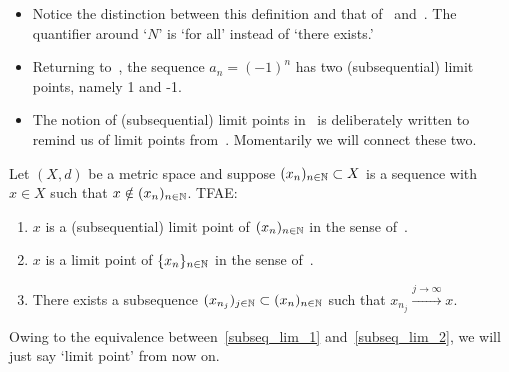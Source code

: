 \begin{rem}
\begin{itemize}
	\item Notice the distinction between this definition and that of~ and~. The quantifier around `$N$' is `for all' instead of `there exists.'
	\item Returning to~, the sequence $a_n = (-1)^n$ has two (subsequential) limit points, namely 1 and -1.
	\item The notion of (subsequential) limit points in~ is deliberately written to remind us of limit points from~. Momentarily we will connect these two.
\end{itemize}
\end{rem}
\begin{prop}
\label{prop:subseq_lim}
Let $(X,d)$ be a metric space and suppose $(x_n)_{n\in\mathbb{N}}\subset X$ is a sequence with $x\in X$ such that $x\notin (x_n)_{n\in\mathbb{N}}$. TFAE:
\begin{enumerate}
	\item \label{subseq_lim_1} $x$ is a (subsequential) limit point of $(x_n)_{n\in\mathbb{N}}$ in the sense of~.
	\item \label{subseq_lim_2} $x$ is a limit point of $\{x_n\}_{n\in\mathbb{N}}$ in the sense of~.
	\item \label{subseq_lim_3} There exists a subsequence $(x_{n_j})_{j\in\mathbb{N}}\subset (x_n)_{n\in\mathbb{N}}$ such that $x_{n_j}\overset{j\to \infty}{\to}x$.
\end{enumerate}
\end{prop}
Owing to the equivalence between~\ref{subseq_lim_1} and~\ref{subseq_lim_2}, we will just say `limit point' from now on.
